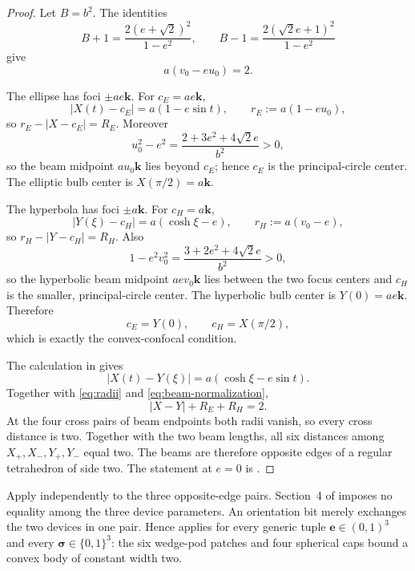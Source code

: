 \documentclass[11pt]{article}
\numberwithin{equation}{section}
\theoremstyle{remark}
\begin{document}
\begin{proof}
Let \(B=b^2\).  The identities
\[
  B+1=\frac{2(e+\sqrt2)^2}{1-e^2},
  \qquad
  B-1=\frac{2(\sqrt2e+1)^2}{1-e^2}
\]
give
\begin{equation}
  a(v_0-eu_0)=2.
  \label{eq:beam-normalization}
\end{equation}

The ellipse has foci \(\pm ae\mathbf k\).  For \(c_E=ae\mathbf k\),
\[
  |X(t)-c_E|=a(1-e\sin t),
  \qquad
  r_E:=a(1-eu_0),
\]
so \(r_E-|X-c_E|=R_E\).  Moreover
\[
  u_0^2-e^2=\frac{2+3e^2+4\sqrt2e}{b^2}>0,
\]
so the beam midpoint \(a u_0\mathbf k\) lies beyond \(c_E\); hence \(c_E\) is the principal-circle center.  The elliptic bulb center is \(X(\pi/2)=a\mathbf k\).

The hyperbola has foci \(\pm a\mathbf k\).  For \(c_H=a\mathbf k\),
\[
  |Y(\xi)-c_H|=a(\cosh\xi-e),
  \qquad
  r_H:=a(v_0-e),
\]
so \(r_H-|Y-c_H|=R_H\).  Also
\[
  1-e^2v_0^2=\frac{3+2e^2+4\sqrt2e}{b^2}>0,
\]
so the hyperbolic beam midpoint \(ae v_0\mathbf k\) lies between the two focus centers and \(c_H\) is the smaller, principal-circle center.  The hyperbolic bulb center is \(Y(0)=ae\mathbf k\).  Therefore
\[
  c_E=Y(0),
  \qquad
  c_H=X(\pi/2),
\]
which is exactly the convex-confocal condition.

The calculation in  gives
\begin{equation}
  |X(t)-Y(\xi)|=a(\cosh\xi-e\sin t).
  \label{eq:center-distance}
\end{equation}
Together with \eqref{eq:radii} and \eqref{eq:beam-normalization},
\begin{equation}
  |X-Y|+R_E+R_H=2.
  \label{eq:local-width}
\end{equation}
At the four cross pairs of beam endpoints both radii vanish, so every cross distance is two.  Together with the two beam lengths, all six distances among \(X_+,X_-,Y_+,Y_-\) equal two.  The beams are therefore opposite edges of a regular tetrahedron of side two.  The statement at \(e=0\) is \cite[Section~5.3]{ArelioMontejanoOliveros2023}.
\end{proof}

Apply  independently to the three opposite-edge pairs.  Section~4 of \cite{ArelioMontejanoOliveros2023} imposes no equality among the three device parameters.  An orientation bit merely exchanges the two devices in one pair.  Hence \cite[Theorem~4.5]{ArelioMontejanoOliveros2023} applies for every generic tuple \(\mathbf e\in(0,1)^3\) and every \(\boldsymbol\sigma\in\{0,1\}^3\): the six wedge-pod patches and four spherical caps bound a convex body of constant width two.
\end{document}
